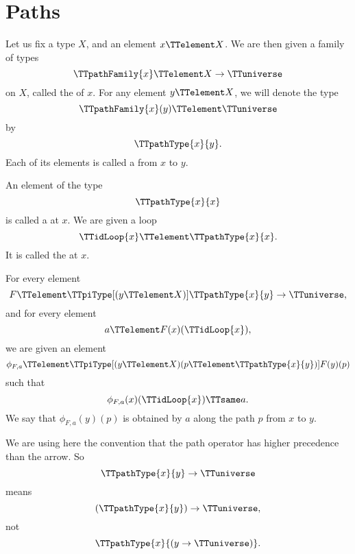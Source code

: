 \documentclass{article}
\begin{document}
\section{Paths}
\label{sec:paths}

Let us fix a type $X$, and an element $x \TTelement X$.  We are then
given a family of types
\begin{equation*}
  \TTpathFamily{x} \TTelement X \to \TTuniverse
\end{equation*}
on $X$, called the  of $x$.  For any element
$y \TTelement X$, we will denote the type
\begin{equation*}
  \TTpathFamily{x} (y) \TTelement \TTuniverse
\end{equation*}
by
\begin{equation*}
  \TTpathType{x}{y}.
\end{equation*}
Each of its elements is called a  from $x$ to $y$.

An element of the type
\begin{equation*}
  \TTpathType{x}{x}
\end{equation*}
is called a  at $x$.  We are given a loop
\begin{equation*}
  \TTidLoop{x} \TTelement \TTpathType{x}{x}.
\end{equation*}
It is called the  at $x$.

For every element
\begin{equation*}
  F
  \TTelement
  \TTpiType[(y \TTelement X)]
  \TTpathType{x}{y} \to \TTuniverse,
\end{equation*}
and for every element
\begin{equation*}
  a \TTelement F(x)(\TTidLoop{x}),
\end{equation*}
we are given an element
\begin{equation*}
  \phi_{F,a}
  \TTelement
  \TTpiType[(y \TTelement X) (p \TTelement \TTpathType{x}{y})]
  F(y)(p)
\end{equation*}
such that
\begin{equation*}
  \phi_{F,a}(x)(\TTidLoop{x}) \TTsame a.
\end{equation*}
We say that $\phi_{F,a}(y)(p)$ is obtained by
 $a$ along the path $p$ from $x$ to $y$.

We are using here the convention that the path operator has higher
precedence than the arrow.  So
\begin{equation*}
  \TTpathType{x}{y} \to \TTuniverse
\end{equation*}
means
\begin{equation*}
  (\TTpathType{x}{y}) \to \TTuniverse,
\end{equation*}
not
\begin{equation*}
  \TTpathType{x}{(y \to \TTuniverse)}.
\end{equation*}
\end{document}
